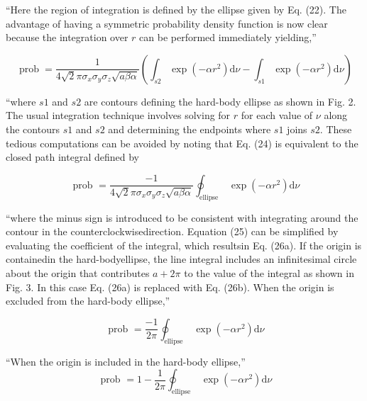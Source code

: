 ``Here the region of integration is defined by the ellipse given by Eq. (22). The advantage of having a symmetric probability density function is now clear because the integration over $r$ can be performed immediately yielding,''


\begin{equation}
    \operatorname{prob}=\frac{1}{4 \sqrt{2} \pi \sigma_{x} \sigma_{y} \sigma_{z} \sqrt{a \beta \alpha}}\left(\int_{s 2} \exp \left(-\alpha r^{2}\right) \mathrm{d} \nu-\int_{s 1} \exp \left(-\alpha r^{2}\right) \mathrm{d} \nu\right)
\end{equation}

``where $s 1$ and $s 2$ are contours defining the hard-body ellipse as shown in Fig. 2. The usual integration technique involves solving for $r$ for each value of $\nu$ along the contours $s 1$ and $s 2$ and determining the endpoints where $s 1$ joins $s 2$. These tedious computations can be avoided by noting that Eq. (24) is equivalent to the closed path integral defined by

\begin{equation}
    \text { prob }=\frac{-1}{4 \sqrt{2} \pi \sigma_{x} \sigma_{y} \sigma_{z} \sqrt{a \beta \alpha}} \oint_{\text {ellipse }} \exp \left(-\alpha r^{2}\right) \mathrm{d} \nu
\end{equation}

``where the minus sign is introduced to be consistent with integrating around the contour in the counterclockwisedirection. Equation (25) can be simplified by evaluating the coefficient of the integral, which resultsin Eq. (26a). If the origin is containedin the hard-bodyellipse, the line integral includes an infinitesimal circle about the origin that contributes $a+2 \pi$ to the value of the integral as shown in Fig. 3. In this case Eq. (26a) is replaced with Eq. (26b). When the origin is excluded from the hard-body ellipse,''

\begin{equation}
    \text { prob }=\frac{-1}{2 \pi} \oint_{\text {ellipse }} \exp \left(-\alpha r^{2}\right) \mathrm{d} \nu
\end{equation}

``When the origin is included in the hard-body ellipse,''
\begin{equation}
    \text { prob }=1-\frac{1}{2 \pi} \oint_{\text {ellipse }} \exp \left(-\alpha r^{2}\right) \mathrm{d} \nu
\end{equation}

